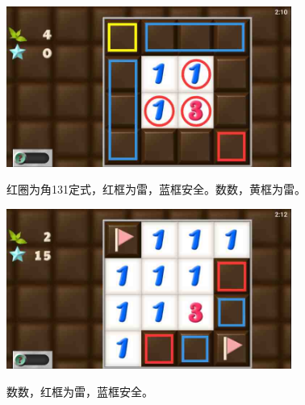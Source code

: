 \subsection{} %
\begin{center}
    \includegraphics[width=0.7\textwidth]{puzzlelow/26-1.jpg}
\end{center}
红圈为角131定式，红框为雷，蓝框安全。数数，黄框为雷。
\begin{center}
    \includegraphics[width=0.7\textwidth]{puzzlelow/26-2.jpg}
\end{center}
数数，红框为雷，蓝框安全。


